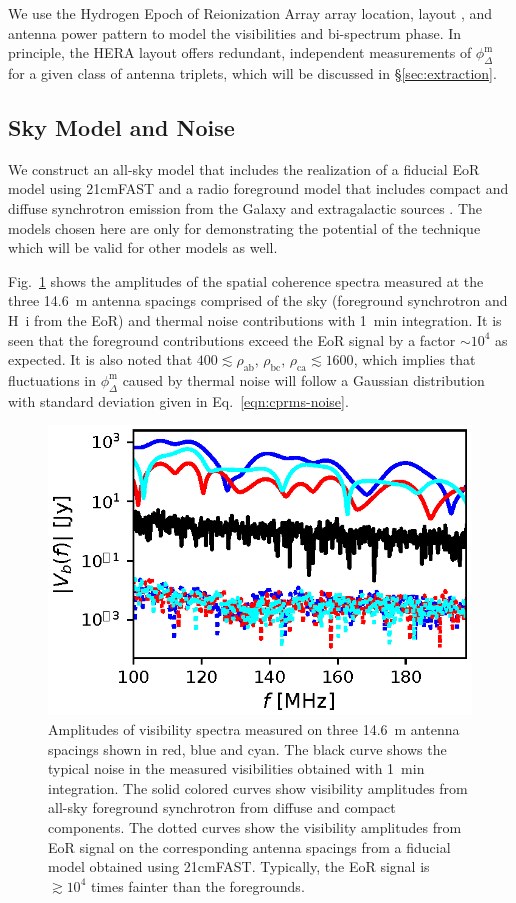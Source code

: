 \documentclass[
reprint,
superscriptaddress,
amsmath,
amssymb,
aps,
prd
]{revtex4-1}
\begin{document}
We use the Hydrogen Epoch of Reionization Array \cite[HERA;][]{deb17,thy16,ewa16,neb16,patra17} array location, layout \cite{dil16}, and antenna power pattern \cite{deb17} to model the visibilities and bi-spectrum phase. In principle, the HERA layout offers redundant, independent measurements of $\phi_\Delta^\textrm{m}$ for a given class of antenna triplets, which will be discussed in \S\ref{sec:extraction}.

\subsection{Sky Model and Noise}\label{sec:skymodel-noise}

We construct an all-sky model that includes the realization of a fiducial EoR model using 21cmFAST \cite{mes11} and a radio foreground model that includes compact and diffuse synchrotron emission from the Galaxy and extragalactic sources \cite{thy15a}. The models chosen here are only for demonstrating the potential of the technique which will be valid for other models as well.

Fig.~\ref{fig:vis-spectra} shows the amplitudes of the spatial coherence spectra measured at the three 14.6~m antenna spacings comprised of the sky (foreground synchrotron and H~{\sc i} from the EoR) and thermal noise contributions with 1~min integration. It is seen that the foreground contributions exceed the EoR signal by a factor $\sim 10^4$ as expected. It is also noted that $400\lesssim \rho_\textrm{ab},\,\rho_\textrm{bc},\,\rho_\textrm{ca} \lesssim 1600$, which implies that fluctuations in $\phi_\Delta^\textrm{m}$ caused by thermal noise will follow a Gaussian distribution with standard deviation given in Eq.~\ref{eqn:cprms-noise}.

\begin{figure}[htb]
\includegraphics[width=0.85\linewidth]{visamp_spectra_asm_eor_noise}
\caption{Amplitudes of visibility spectra measured on three 14.6~m antenna spacings shown in red, blue and cyan. The black curve shows the typical noise in the measured visibilities obtained with 1~min integration. The solid colored curves show visibility amplitudes from all-sky foreground synchrotron from diffuse and compact components. The dotted curves show the visibility amplitudes from EoR signal on the corresponding antenna spacings from a fiducial model obtained using 21cmFAST. Typically, the EoR signal is $\gtrsim 10^4$ times fainter than the foregrounds. \label{fig:vis-spectra}}
\end{figure}
\end{document}
